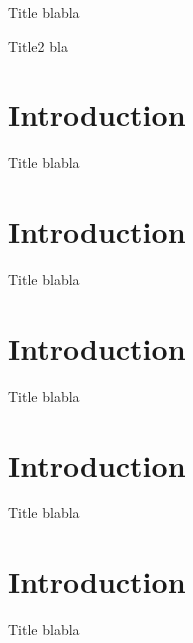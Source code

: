 \documentclass{beamer}
\begin{document}
\begin{frame}{Title}
blabla

\end{frame}

\begin{frame}{Title2}
	bla
\end{frame}

\section{Introduction}

\begin{frame}{Title}
blabla

\end{frame}

\section{Introduction}

\begin{frame}{Title}
blabla

\end{frame}

\section{Introduction}

\begin{frame}{Title}
blabla

\end{frame}


\section{Introduction}

\begin{frame}{Title}
blabla

\end{frame}

\section{Introduction}

\begin{frame}{Title}
blabla

\end{frame}

\end{document}
